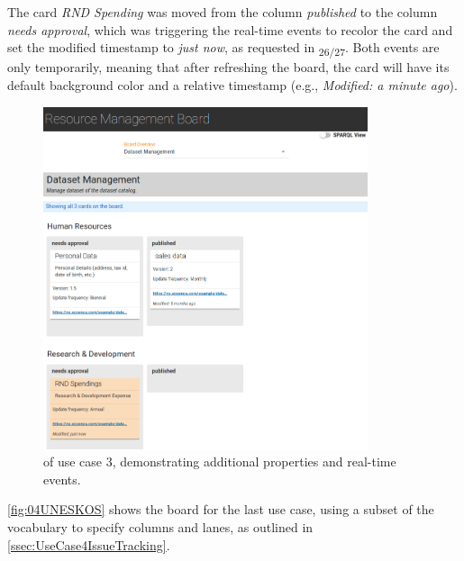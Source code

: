 The card \textit{RND Spending} was moved from the column \textit{published} to the column \textit{needs approval}, which was triggering the real-time events to recolor the card and set the modified timestamp to \textit{just now}, as requested in \textsubscript{26/27}. Both events are only temporarily, meaning that after refreshing the board, the card will have its default background color and a relative timestamp (e.g., \textit{Modified: a minute ago}).



\begin{figure}[H]
\centering
\includegraphics[width=0.85\textwidth]{img/05-DatasetMGMT.png}
	\caption[ of Use Case 3]{ of use case 3, demonstrating additional properties and real-time events.}
	\label{fig:05DatasetMGMT}
\end{figure}

\newpage


\noindent \autoref{fig:04UNESKOS} shows the board for the last use case, using a subset of the  vocabulary to specify columns and lanes, as outlined in \autoref{ssec:UseCase4IssueTracking}.


